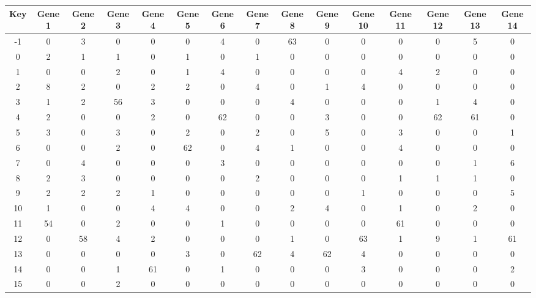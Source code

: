 \begin{tabular}{|c|c|c|c|c|c|c|c|c|c|c|c|c|c|c|}
\hline
Key & Gene 1 & Gene 2 & Gene 3 & Gene 4 & Gene 5 & Gene 6 & Gene 7 & Gene 8 & Gene 9 & Gene 10 & Gene 11 & Gene 12 & Gene 13 & Gene 14 \\
\hline
-1 & 0 & 3 & 0 & 0 & 0 & 4 & 0 & 63 & 0 & 0 & 0 & 0 & 5 & 0 \\
0 & 2 & 1 & 1 & 0 & 1 & 0 & 1 & 0 & 0 & 0 & 0 & 0 & 0 & 0 \\
1 & 0 & 0 & 2 & 0 & 1 & 4 & 0 & 0 & 0 & 0 & 4 & 2 & 0 & 0 \\
2 & 8 & 2 & 0 & 2 & 2 & 0 & 4 & 0 & 1 & 4 & 0 & 0 & 0 & 0 \\
3 & 1 & 2 & 56 & 3 & 0 & 0 & 0 & 4 & 0 & 0 & 0 & 1 & 4 & 0 \\
4 & 2 & 0 & 0 & 2 & 0 & 62 & 0 & 0 & 3 & 0 & 0 & 62 & 61 & 0 \\
5 & 3 & 0 & 3 & 0 & 2 & 0 & 2 & 0 & 5 & 0 & 3 & 0 & 0 & 1 \\
6 & 0 & 0 & 2 & 0 & 62 & 0 & 4 & 1 & 0 & 0 & 4 & 0 & 0 & 0 \\
7 & 0 & 4 & 0 & 0 & 0 & 3 & 0 & 0 & 0 & 0 & 0 & 0 & 1 & 6 \\
8 & 2 & 3 & 0 & 0 & 0 & 0 & 2 & 0 & 0 & 0 & 1 & 1 & 1 & 0 \\
9 & 2 & 2 & 2 & 1 & 0 & 0 & 0 & 0 & 0 & 1 & 0 & 0 & 0 & 5 \\
10 & 1 & 0 & 0 & 4 & 4 & 0 & 0 & 2 & 4 & 0 & 1 & 0 & 2 & 0 \\
11 & 54 & 0 & 2 & 0 & 0 & 1 & 0 & 0 & 0 & 0 & 61 & 0 & 0 & 0 \\
12 & 0 & 58 & 4 & 2 & 0 & 0 & 0 & 1 & 0 & 63 & 1 & 9 & 1 & 61 \\
13 & 0 & 0 & 0 & 0 & 3 & 0 & 62 & 4 & 62 & 4 & 0 & 0 & 0 & 0 \\
14 & 0 & 0 & 1 & 61 & 0 & 1 & 0 & 0 & 0 & 3 & 0 & 0 & 0 & 2 \\
15 & 0 & 0 & 2 & 0 & 0 & 0 & 0 & 0 & 0 & 0 & 0 & 0 & 0 & 0 \\
\hline
\end{tabular}
